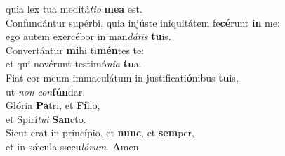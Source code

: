\oddverse quia lex tua meditá\textit{ti}\textit{o} \textbf{me}\textbf{a} est.\\
\evenverse Confundántur supérbi, quia injúste iniquitátem fe\textbf{cé}runt \textbf{in} me:~\*\\
\evenverse ego autem exercébor in man\textit{dá}\textit{tis} \textbf{tu}is.\\
\oddverse Convertántur \textbf{mi}hi ti\textbf{mén}tes te:~\*\\
\oddverse et qui novérunt testimó\textit{ni}\textit{a} \textbf{tu}a.\\
\evenverse Fiat cor meum immaculátum in justificati\textbf{ó}nibus \textbf{tu}is,~\*\\
\evenverse ut \textit{non} \textit{con}\textbf{fún}dar.\\
\oddverse Glória \textbf{Pa}tri, et \textbf{Fí}lio,~\*\\
\oddverse et Spirí\textit{tu}\textit{i} \textbf{San}cto.\\
\evenverse Sicut erat in princípio, et \textbf{nunc}, et \textbf{sem}per,~\*\\
\evenverse et in sǽcula sæcu\textit{ló}\textit{rum}. \textbf{A}men.\\
